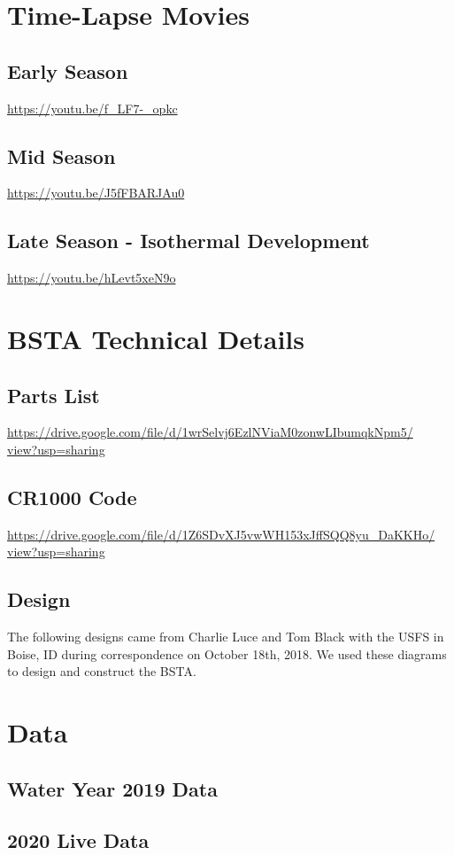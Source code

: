 

\newpage %
\chapter{Time-Lapse Movies}
\section{Early Season} 
\href{https://youtu.be/f_LF7-_opkc}{https://youtu.be/f\_LF7-\_opkc} 
\section{Mid Season} 
\href{https://youtu.be/J5fFBARJAu0}{https://youtu.be/J5fFBARJAu0}
\section{Late Season - Isothermal Development} 
\href{https://youtu.be/hLevt5xeN9o}{https://youtu.be/hLevt5xeN9o}

\chapter{BSTA Technical Details}
\section{Parts List}
\href{https://drive.google.com/file/d/1wrSelvj6EzlNViaM0zonwLIbumqkNpm5/view?usp=sharing}{https://drive.google.com/file/d/1wrSelvj6EzlNViaM0zonwLIbumqkNpm5/ \\ view?usp=sharing}
\section{CR1000 Code}
\href{https://drive.google.com/file/d/1Z6SDvXJ5vwWH153xJffSQQ8yu_DaKKHo/view?usp=sharing}{https://drive.google.com/file/d/1Z6SDvXJ5vwWH153xJffSQQ8yu_DaKKHo/ \\ view?usp=sharing}

\section{Design}
The following designs came from Charlie Luce and Tom Black with the USFS in Boise, ID during correspondence on October 18th, 2018. We used these diagrams to design and construct the BSTA. 




\chapter{Data}
\section{Water Year 2019 Data}
\section{2020 Live Data}


